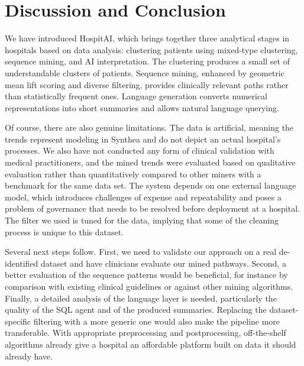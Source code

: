 \section{Discussion and Conclusion}
\label{sec:conclusion}

We have introduced HospitAI, which brings together three analytical stages in hospitals based on data analysis: clustering patients using mixed-type clustering, sequence mining, and AI interpretation. The clustering produces a small set of understandable clusters of patients. Sequence mining, enhanced by geometric mean lift scoring and diverse filtering, provides clinically relevant paths rather than statistically frequent ones. Language generation converts numerical representations into short summaries and allows natural language querying.

Of course, there are also genuine limitations. The data is artificial, meaning the trends represent modeling in Synthea and do not depict an actual hospital's processes. We also have not conducted any form of clinical validation with medical practitioners, and the mined trends were evaluated based on qualitative evaluation rather than quantitatively compared to other miners with a benchmark for the same data set. The system depends on one external language model, which introduces challenges of expense and repeatability and poses a problem of governance that needs to be resolved before deployment at a hospital. The filter we used is tuned for the data, implying that some of the cleaning process is unique to this dataset.

Several next steps follow. First, we need to validate our approach on a real de-identified dataset and have clinicians evaluate our mined pathways. Second, a better evaluation of the sequence patterns would be beneficial, for instance by comparison with existing clinical guidelines or against other mining algorithms. Finally, a detailed analysis of the language layer is needed, particularly the quality of the SQL agent and of the produced summaries. Replacing the dataset-specific filtering with a more generic one would also make the pipeline more transferable. With appropriate preprocessing and postprocessing, off-the-shelf algorithms already give a hospital an affordable platform built on data it should already have.
